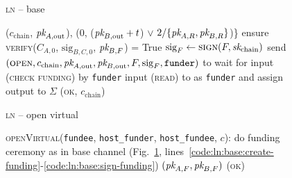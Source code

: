 \begin{figure}[H]
\begin{processbox}{\textsc{ln} -- base}
\begin{algorithmic}[1]
{          ($c_{\mathrm{chain}}$, $\textit{pk}_{A, \mathrm{out}}$), ($0$, ($\textit{pk}_{B,
          \mathrm{out}} + t$) $\vee$ $2/\{\textit{pk}_{A, R}, \textit{pk}_{B, R}\}$)\}}
          \State {}
          \State {}
          \State {}
          \State {}
          \State ensure \textsc{verify}($C_{A, 0}$, $\mathrm{sig}_{B, C, 0}$,
          $\textit{pk}_{B, F}$) = True
        \EndIf
        \State $\mathrm{sig}_F \gets \textsc{sign}(F, \textit{sk}_{\mathrm{chain}})$
        \label{code:ln:base:sign-funding}
        \State send $(\textsc{open}, c_{\mathrm{chain}}, \textit{pk}_{A, \mathrm{out}},
        \textit{pk}_{B, \mathrm{out}}, F, \mathrm{sig}_F, \texttt{funder})$ to \adversary
          \State wait for input (\textsc{check funding}) by \texttt{funder}
          \State input (\textsc{read}) to \ledger as \texttt{funder} and assign
          output to $\Sigma$
        \EndWhile
        \State \Return (\textsc{ok}, $c_{\mathrm{chain}}$)
      \EndIndent
    \end{algorithmic}
  \end{processbox}
  \caption{}
  \label{code:ln:base}
\end{figure}

\begin{figure}[H]
  \begin{processbox}{\textsc{ln} -- open virtual}
    \begin{algorithmic}[1]
      \State \textsc{openVirtual}(\texttt{fundee}, \texttt{host\_funder},
      \texttt{host\_fundee}, $c$):
      \Indent
          \State do funding ceremony as in base channel
          (Fig.~\ref{code:ln:base},
          lines~\ref{code:ln:base:create-funding}-\ref{code:ln:base:sign-funding})
          \State \Return $(\textit{pk}_{A, F}, \textit{pk}_{B, F})$
        \EndIf
        \State \Return (\textsc{ok})
      \EndIndent
    \end{algorithmic}
  \end{processbox}
  \caption{}
  \label{code:ln:open-virtual}
\end{figure}

